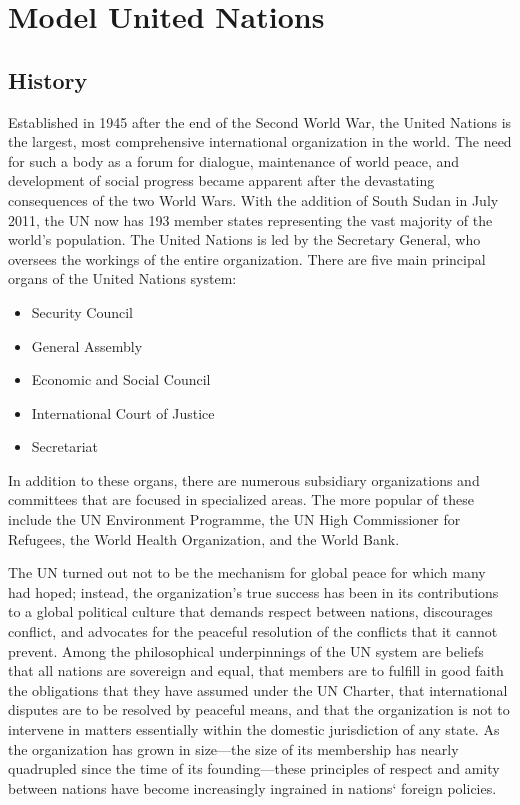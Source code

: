 \chapter{Model United Nations}

\section{History}
Established in 1945 after the end of the Second World War, the 
United Nations is the largest, most comprehensive international 
organization in the world. The need for such a body as a forum 
for dialogue, maintenance of world peace, and development 
of social progress became apparent after the devastating 
consequences of the two World Wars. With the addition of 
South Sudan in July 2011, the UN now has 193 member states 
representing the vast majority of the world’s population.
The United Nations is led by the Secretary General, who oversees 
the workings of the entire organization. There are five main 
principal organs of the United Nations system:
\begin{itemize}
	\item Security Council
	\item General Assembly
	\item Economic and Social Council
	\item International Court of Justice
	\item Secretariat
\end{itemize}
In addition to these organs, there are numerous subsidiary 
organizations and committees that are focused in specialized 
areas. The more popular of these include the UN Environment 
Programme, the UN High Commissioner for Refugees, the 
World Health Organization, and the World Bank.

The UN turned out not to be the mechanism for global peace for which many had hoped; instead, the organization's true success has been in its contributions to a global political culture that demands respect between nations, discourages conflict, and 
advocates for the peaceful resolution of the conflicts that it cannot prevent. Among the philosophical underpinnings of the UN system are beliefs that all nations are sovereign and equal, that members are to fulfill in good faith the obligations that they have assumed under the UN Charter, that international disputes are to be resolved by peaceful means, and that the organization is not to intervene in matters essentially within the domestic jurisdiction of any state. As the organization has grown in size—the size of its membership has nearly quadrupled since the time of its founding—these principles of respect and amity between nations have become increasingly ingrained in nations` foreign policies. 

